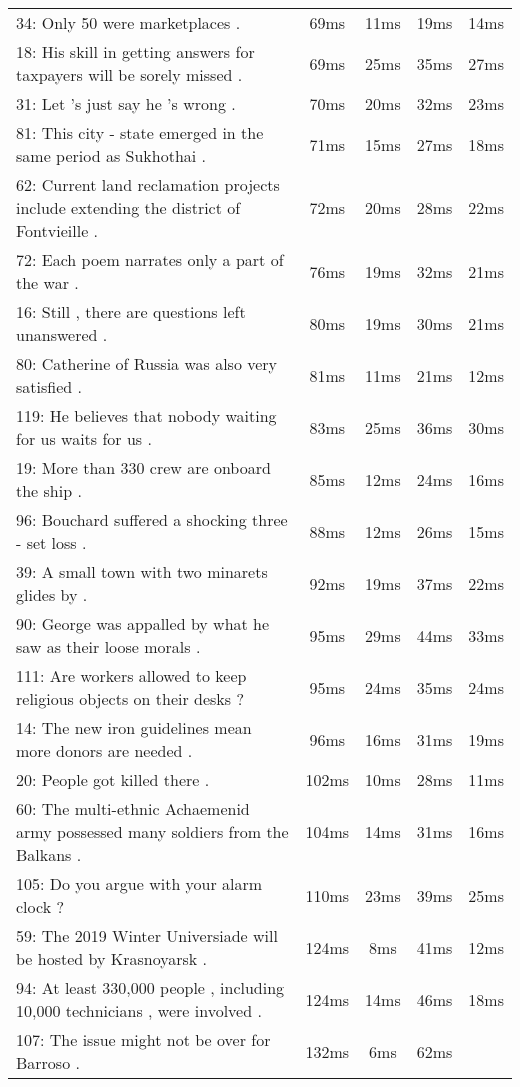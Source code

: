 \begin{longtable}[]{@{}p{40mm}cccc@{}}
34: Only 50 were marketplaces . & 69ms & 11ms & 19ms & 14ms \\
18: His skill in getting answers for taxpayers will be sorely missed . &
69ms & 25ms & 35ms & 27ms \\
31: Let 's just say he 's wrong . & 70ms & 20ms & 32ms & 23ms \\
81: This city - state emerged in the same period as Sukhothai . & 71ms &
15ms & 27ms & 18ms \\
62: Current land reclamation projects include extending the district of
Fontvieille . & 72ms & 20ms & 28ms & 22ms \\
72: Each poem narrates only a part of the war . & 76ms & 19ms & 32ms &
21ms \\
16: Still , there are questions left unanswered . & 80ms & 19ms & 30ms &
21ms \\
80: Catherine of Russia was also very satisfied . & 81ms & 11ms & 21ms &
12ms \\
119: He believes that nobody waiting for us waits for us . & 83ms & 25ms
& 36ms & 30ms \\
19: More than 330 crew are onboard the ship . & 85ms & 12ms & 24ms &
16ms \\
96: Bouchard suffered a shocking three - set loss . & 88ms & 12ms & 26ms
& 15ms \\
39: A small town with two minarets glides by . & 92ms & 19ms & 37ms &
22ms \\
90: George was appalled by what he saw as their loose morals . & 95ms &
29ms & 44ms & 33ms \\
111: Are workers allowed to keep religious objects on their desks ? &
95ms & 24ms & 35ms & 24ms \\
14: The new iron guidelines mean more donors are needed . & 96ms & 16ms
& 31ms & 19ms \\
20: People got killed there . & 102ms & 10ms & 28ms & 11ms \\
60: The multi-ethnic Achaemenid army possessed many soldiers from the
Balkans . & 104ms & 14ms & 31ms & 16ms \\
105: Do you argue with your alarm clock ? & 110ms & 23ms & 39ms &
25ms \\
59: The 2019 Winter Universiade will be hosted by Krasnoyarsk . & 124ms
& 8ms & 41ms & 12ms \\
94: At least 330,000 people , including 10,000 technicians , were
involved . & 124ms & 14ms & 46ms & 18ms \\
107: The issue might not be over for Barroso . & 132ms & 6ms & 62ms &

\end{longtable}
